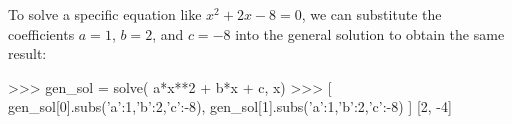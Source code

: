 To solve a specific equation like $x^2+2x-8=0$,
we can substitute the coefficients $a=1$, $b=2$, and $c=-8$ into 
the general solution to obtain the same result:

\small
\begin{verbatimtab}
>>> gen_sol = solve( a*x**2 + b*x + c, x)
>>> [ gen_sol[0].subs({'a':1,'b':2,'c':-8}), 
      gen_sol[1].subs({'a':1,'b':2,'c':-8})  ]
[2, -4]
\end{verbatimtab}
\normalsize

